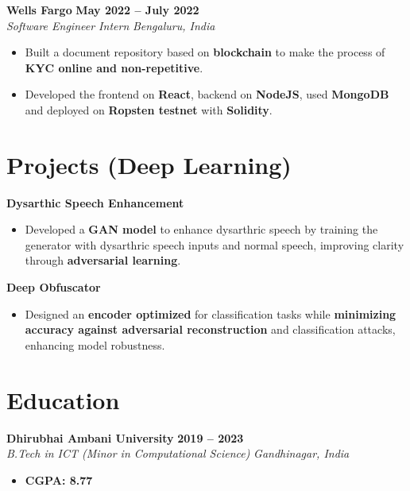 \documentclass[10pt,a4paper,sans]{moderncv}
\begin{document}
\vspace{4pt}

\noindent
\textbf{Wells Fargo} \hfill \textbf{May 2022 -- July 2022} \\
\textit{Software Engineer Intern} \hfill \textit{Bengaluru, India}
\begin{itemize}
    \item Built a document repository based on \textbf{blockchain} to make the process of \textbf{KYC online and non-repetitive}.
    \item Developed the frontend on \textbf{React}, backend on \textbf{NodeJS}, used \textbf{MongoDB} and deployed on \textbf{Ropsten testnet} with \textbf{Solidity}.
\end{itemize}

\section{Projects (Deep Learning)}

\textbf{Dysarthic Speech Enhancement}
\begin{itemize}
    \item Developed a \textbf{GAN model} to enhance dysarthric speech by training the generator with dysarthric speech inputs and normal speech, improving clarity through \textbf{adversarial learning}.
\end{itemize}

\vspace{3pt}

\textbf{Deep Obfuscator}
\begin{itemize}
    \item Designed an \textbf{encoder optimized} for classification tasks while \textbf{minimizing accuracy against adversarial reconstruction} and classification attacks, enhancing model robustness.
\end{itemize}

\section{Education}

\noindent
\textbf{Dhirubhai Ambani University} \hfill \textbf{2019 -- 2023} \\
\textit{B.Tech in ICT (Minor in Computational Science)} \hfill \textit{Gandhinagar, India}
\begin{itemize}
    \item \textbf{CGPA: 8.77}
\end{itemize}
\end{document}
